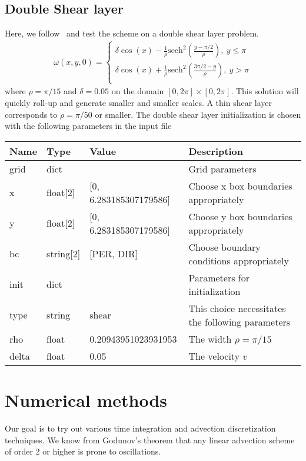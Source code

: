 \subsection{ Double Shear layer}
Here, we follow~\cite{Liu2000} and test the scheme on a double shear layer problem.
\begin{align}
    \omega(x,y,0) = \begin{cases}
        \delta \cos(x) - \frac{1}{\rho} \text{sech}^2 \left(\frac{y-\pi/2}{\rho}\right),\ y \leq \pi \\
        \delta \cos(x) + \frac{1}{\rho} \text{sech}^2 \left(\frac{3\pi/2-y}{\rho}\right),\ y > \pi \\
    \end{cases}
\end{align}
where $\rho = \pi/15$ and $\delta =0.05$ on the domain $[0,2\pi]\times [0,2\pi]$.
This solution will quickly roll-up and generate smaller and smaller scales.
A thin shear layer corresponds to $\rho = \pi/50$ or smaller.
The double shear layer initialization is chosen with the following parameters in the input file
\begin{longtable}{llll}
\toprule
\rowcolor{gray!50}\textbf{Name} &  \textbf{Type} & \textbf{Value}  & \textbf{Description}  \\ \midrule
grid & dict &  & Grid parameters \\
\qquad x & float[2]& [0, 6.283185307179586] & Choose x box boundaries appropriately \\
\qquad y & float[2]& [0, 6.283185307179586] & Choose y box boundaries appropriately \\
\qquad bc & string[2] & [PER, DIR] & Choose boundary conditions appropriately \\
init &  dict &   & Parameters for initialization \\
\qquad type      & string & shear & This choice necessitates the following parameters \\
\qquad rho    & float & 0.20943951023931953 & The width $\rho = \pi/15$ \\
\qquad delta  & float & 0.05 & The velocity $v$ \\
\bottomrule
\end{longtable}

\section{Numerical methods}
Our goal is to try out various time integration and advection discretization techniques.
We know from Godunov's theorem
that any linear advection scheme of order 2 or higher is prone to oscillations.
